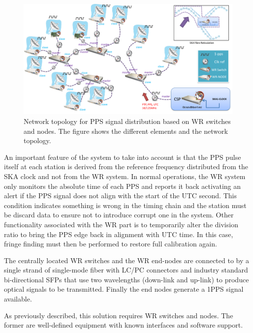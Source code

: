 \begin{figure}[H]
	\centering
	\includegraphics[scale=0.4]{img/ska_pps_network}
	\caption{Network topology for PPS signal distribution based on WR switches and nodes. The figure shows the different elements and the network topology. }
	\label{fig:ska_pps_dist_network}
\end{figure}

 
An important feature of the system to take into account is that the PPS pulse itself at each station is derived from the reference frequency distributed from the SKA clock and not from the WR system. In normal operations, the WR system only monitors the absolute time of each PPS and reports it back activating an alert if the PPS signal does not align with the start of the UTC second. This condition indicates something is wrong in the timing chain and the station must be discard data to ensure not to introduce corrupt one in the system. Other functionality associated with the WR part is to temporarily alter the division ratio to bring the PPS edge back in alignment with UTC time. In this case, fringe finding must then be performed to restore full calibration again.

The centrally located WR switches and the WR end-nodes are connected to by a 
single strand of single-mode fiber with LC/PC connectors and industry standard 
bi-directional SFPs that use two wavelengths (down-link and up-link) to produce 
optical signals to be transmitted. Finally the end nodes generate a 1PPS signal available. 

As previously described, this solution requires WR switches and nodes. The former are well-defined equipment with known interfaces and software support. 


